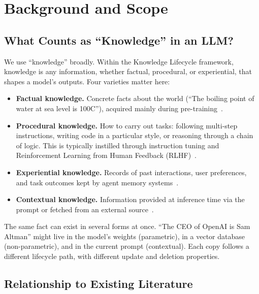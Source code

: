 \documentclass[manuscript, screen, review]{jair}
\begin{document}
\section{Background and Scope}
\label{sec:background}

\subsection{What Counts as ``Knowledge'' in an LLM?}

We use ``knowledge'' broadly. Within the Knowledge Lifecycle framework, knowledge is any information, whether factual, procedural, or experiential, that shapes a model's outputs. Four varieties matter here:

\begin{itemize}[leftmargin=*]
  \item \textbf{Factual knowledge.} Concrete facts about the world (``The boiling point of water at sea level is 100\textdegree C''), acquired mainly during pre-training~\citep{petroni2019lama}.
  \item \textbf{Procedural knowledge.} How to carry out tasks: following multi-step instructions, writing code in a particular style, or reasoning through a chain of logic. This is typically instilled through instruction tuning and Reinforcement Learning from Human Feedback (RLHF)~\citep{ouyang2022instructgpt, wei2022flan}.
  \item \textbf{Experiential knowledge.} Records of past interactions, user preferences, and task outcomes kept by agent memory systems~\citep{park2023generative, packer2023memgpt}.
  \item \textbf{Contextual knowledge.} Information provided at inference time via the prompt or fetched from an external source~\citep{lewis2020rag}.
\end{itemize}

The same fact can exist in several forms at once. ``The CEO of OpenAI is Sam Altman'' might live in the model's weights (parametric), in a vector database (non-parametric), and in the current prompt (contextual). Each copy follows a different lifecycle path, with different update and deletion properties.

\subsection{Relationship to Existing Literature}
\end{document}
